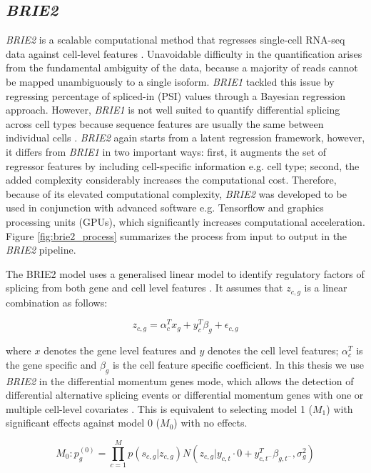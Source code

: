 \subsection{\emph{BRIE2}}
\emph{BRIE2} is a scalable computational method that regresses single-cell RNA-seq data against cell-level features \citep{brie2}. Unavoidable difficulty in the quantification arises from the fundamental ambiguity of the data, because a majority of reads cannot be mapped unambiguously to a single isoform. \emph{BRIE1} tackled this issue by regressing percentage of spliced-in (PSI) values through a Bayesian regression approach. However, \emph{BRIE1} is not well suited to quantify differential splicing across cell types because sequence features are usually the same between individual cells \citep{brie2}. \emph{BRIE2} again starts from a latent regression framework, however, it differs from \emph{BRIE1} in two important ways: first, it augments the set of regressor features by including cell-specific information e.g. cell type; second, the added complexity considerably increases the computational cost. Therefore, because of its elevated computational complexity, \emph{BRIE2} was developed to be used in conjunction with advanced software e.g. Tensorflow and graphics processing units (GPUs), which significantly increases computational acceleration. Figure \ref{fig:brie2_process} summarizes the process from input to output in the \emph{BRIE2} pipeline.

The BRIE2 model uses a generalised linear model to identify regulatory factors of splicing from both gene and cell level features \citep{brie2}. It assumes that $z_{c,g}$ is a linear combination as follows:

\begin{equation}
z_{c,g} = \alpha_c^T x_g + y_c^T \beta_g + \epsilon_{c,g}
\label{eqn:brie_A}
\end{equation}

where $x$ denotes the gene level features and $y$ denotes the cell level features; $\alpha_c^T$ is the gene specific and $\beta_g$ is the cell feature specific coefficient. In this thesis we use \emph{BRIE2} in the differential momentum genes mode, which allows the detection of differential alternative splicing events or differential momentum genes with one or multiple cell-level covariates \citep{brie2}. This is equivalent to selecting model 1 ($M_1$) with significant effects against model 0 ($M_0$) with no effects.

\begin{equation}
M_0: p_g^{(0)} = \prod_{c=1}^{M}{p(s_{c,g} | z_{c,g}) N(z_{c,g} | y_{c,t} \cdot 0 + y_{c,t^-}^T \beta_{g,t^-}, \sigma_g^2)}
\label{eqn:brie_B}
\end{equation}

